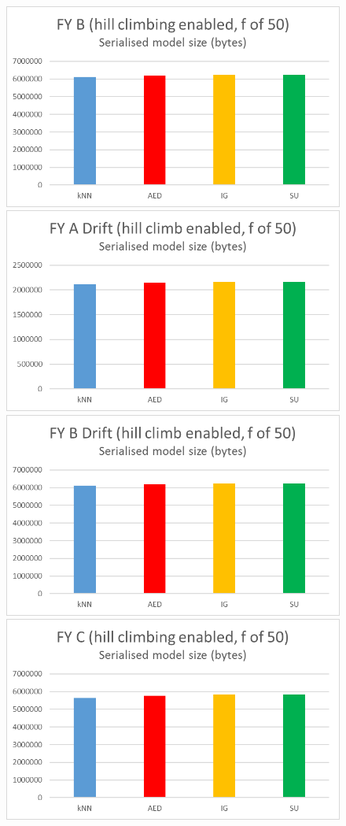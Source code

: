 \begin{figure}[hp]
\includegraphics[scale=0.17]{Graphs/FY_B/H_bytes}
\includegraphics[scale=0.17]{Graphs/FY_A_Drift/H_bytes}
\includegraphics[scale=0.17]{Graphs/FY_B_Drift/H_bytes}
\includegraphics[scale=0.17]{Graphs/FY_C/H_bytes}

\end{figure}
